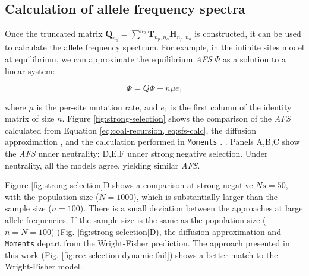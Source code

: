 \documentclass[review]{elsarticle}
\begin{document}
\subsection{Calculation of allele frequency spectra}
\label{subsec:afs}

Once the truncated matrix
$\mathbf{Q}_{n_o} = \sum^{n_{o}} \mathbf{T}_{n_p,n_o} \mathbf{H}_{n_p,n_o}$ is constructed, it can
be used to calculate the allele frequency spectrum. For example, in the infinite sites model at
equilibrium, we can approximate the equilibrium \textit{AFS} $\Phi$ as a solution to a linear
system:

\begin{equation}
  \label{eq:sfs-calc}
  \Phi = Q \Phi  + n \mu e_1
\end{equation}

where $\mu$ is the per-site mutation rate, and $e_1$ is the first column of the identity matrix of
size $n$. Figure \ref{fig:strong-selection} shows the comparison of the \textit{AFS} calculated from
Equation \eqref{eq:coal-recursion, eq:sfs-calc}, the diffusion approximation \cite[eq.
9.23]{Ewens2004}, and the calculation performed in \texttt{Moments} \citep{JouganousEtAl2017}. .
Panels A,B,C show the \textit{AFS} under neutrality; D,E,F under strong negative selection. Under
neutrality, all the models agree, yielding similar \textit{AFS}.

Figure \ref{fig:strong-selection}D shows a comparison at strong negative $Ns=50$, with the
population size ($N=1000$), which is substantially larger than the sample size ($n=100$). There is a
small deviation between the approaches at large allele frequencies. If the sample size is the same
as the population size ($n=N=100$) (Fig. \ref{fig:strong-selection}D), the diffusion approximation
and \texttt{Moments} depart from the Wright-Fisher prediction. The approach presented in this work
(Fig. \ref{fig:rec-selection-dynamic-fail}) shows a better match to the Wright-Fisher model.
\end{document}
